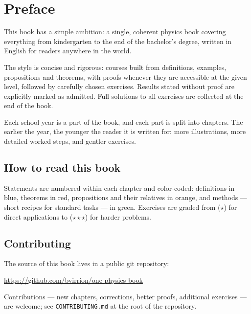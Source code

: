 \chapter{Preface}

This book has a simple ambition: a single, coherent physics book
covering everything from kindergarten to the end of the bachelor's degree,
written in English for readers anywhere in the world.

The style is concise and rigorous: courses built from definitions, examples,
propositions and theorems, with proofs whenever they are accessible at the
given level, followed by carefully chosen exercises. Results stated without
proof are explicitly marked as admitted. Full solutions to all exercises are
collected at the end of the book.

Each school year is a part of the book, and each part is split into
chapters. The earlier the year, the younger the reader it is written
for: more illustrations, more detailed worked steps, and gentler
exercises.

\section*{How to read this book}

Statements are numbered within each chapter and color-coded: definitions in
blue, theorems in red, propositions and their relatives in orange, and
methods --- short recipes for standard tasks --- in green. Exercises are
graded from ($\star$) for direct applications to ($\star\star\star$) for
harder problems.

\section*{Contributing}

The source of this book lives in a public git repository:
\begin{center}
\url{https://github.com/bvirrion/one-physics-book}
\end{center}
Contributions --- new chapters, corrections, better proofs, additional
exercises --- are welcome; see \texttt{CONTRIBUTING.md} at the root of the
repository.

